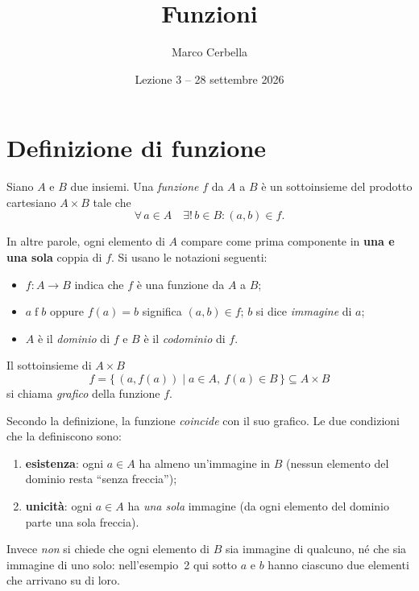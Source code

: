 \documentclass[11pt,a4paper]{article}
\title{Funzioni}
\author{Marco Cerbella}
\date{Lezione 3 -- 28 settembre 2026}
\begin{document}
\maketitle

\section{Definizione di funzione}

\begin{definizione}
Siano $A$ e $B$ due insiemi. Una \emph{funzione} $f$ da $A$ a $B$ è un
sottoinsieme del prodotto cartesiano $A \times B$ tale che
\[
\forall\, a \in A \quad \exists!\, b \in B : (a, b) \in f.
\]
\end{definizione}

In altre parole, ogni elemento di $A$ compare come prima componente in
\textbf{una e una sola} coppia di $f$. Si usano le notazioni seguenti:
\begin{itemize}
    \item $f : A \to B$ indica che $f$ è una funzione da $A$ a $B$;
    \item $a \mathrel{f} b$ oppure $f(a) = b$ significa $(a, b) \in f$;
          $b$ si dice \emph{immagine} di $a$;
    \item $A$ è il \emph{dominio} di $f$ e $B$ è il \emph{codominio} di $f$.
\end{itemize}

Il sottoinsieme di $A \times B$
\[
f = \{\, (a, f(a)) \mid a \in A,\ f(a) \in B \,\} \subseteq A \times B
\]
si chiama \emph{grafico} della funzione $f$.

\begin{osservazione}
Secondo la definizione, la funzione \emph{coincide} con il suo grafico.
Le due condizioni che la definiscono sono:
\begin{enumerate}
    \item \textbf{esistenza}: ogni $a \in A$ ha almeno un'immagine in $B$
          (nessun elemento del dominio resta ``senza freccia'');
    \item \textbf{unicità}: ogni $a \in A$ ha \emph{una sola} immagine
          (da ogni elemento del dominio parte una sola freccia).
\end{enumerate}
Invece \emph{non} si chiede che ogni elemento di $B$ sia immagine di
qualcuno, né che sia immagine di uno solo: nell'esempio~2 qui sotto $a$ e
$b$ hanno ciascuno due elementi che arrivano su di loro.
\end{osservazione}
\end{document}

